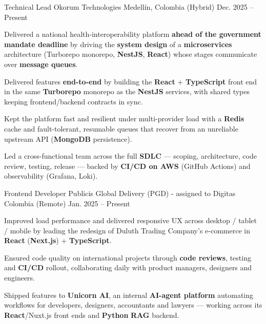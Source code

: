 \newcommand{\quotes}[1]{``#1''}

\begin{cventries}

  \cventry
  {Technical Lead}
  {Okorum Technologies}
  {Medellín, Colombia (Hybrid)}
  {Dec. 2025 -- Present}
  {
    \begin{cvitems}
      \item {Delivered a national health-interoperability platform \textbf{ahead of the government mandate deadline} by driving the \textbf{system design} of a \textbf{microservices} architecture (Turborepo monorepo, \textbf{NestJS}, \textbf{React}) whose stages communicate over \textbf{message queues}.}
      \item {Delivered features \textbf{end-to-end} by building the \textbf{React} + \textbf{TypeScript} front end in the same \textbf{Turborepo} monorepo as the \textbf{NestJS} services, with shared types keeping frontend/backend contracts in sync.}
      \item {Kept the platform fast and resilient under multi-provider load with a \textbf{Redis} cache and fault-tolerant, resumable queues that recover from an unreliable upstream API (\textbf{MongoDB} persistence).}
      \item {Led a cross-functional team across the full \textbf{SDLC} --- scoping, architecture, code review, testing, release --- backed by \textbf{CI/CD on AWS} (GitHub Actions) and observability (Grafana, Loki).}
    \end{cvitems}
  }

  \cventry
  {Frontend Developer}
  {Publicis Global Delivery (PGD) - assigned to Digitas}
  {Colombia (Remote)}
  {Jan. 2025 -- Present}
  {
    \begin{cvitems}
      \item {Improved load performance and delivered responsive UX across desktop / tablet / mobile by leading the redesign of Duluth Trading Company's e-commerce in \textbf{React} (\textbf{Next.js}) + \textbf{TypeScript}.}
      \item {Ensured code quality on international projects through \textbf{code reviews}, testing and \textbf{CI/CD} rollout, collaborating daily with product managers, designers and engineers.}
      \item {Shipped features to \textbf{Unicorn AI}, an internal \textbf{AI-agent platform} automating workflows for developers, designers, accountants and lawyers --- working across its \textbf{React}/Nuxt.js front ends and \textbf{Python} \textbf{RAG} backend.}
    \end{cvitems}
  }


\end{cventries}
